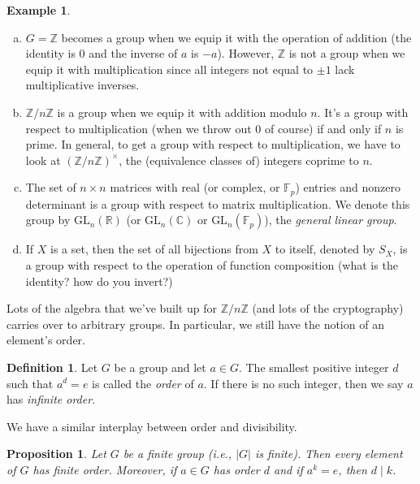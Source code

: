 \documentclass[12pt]{article}
\theoremstyle{plain}
\newtheorem{proposition}[theorem]{Proposition}
\theoremstyle{definition}
\newtheorem{definition}[theorem]{Definition}
\newtheorem{example}[theorem]{Example}
\theoremstyle{remark}
\newcommand{\Z}{\mathbb{Z}}
\newcommand{\C}{\mathbb{C}}
\newcommand{\R}{\mathbb{R}}
\newcommand{\F}{\mathbb{F}}
\begin{document}
\begin{example}
    \begin{enumerate}[(a)]
        \item $G = \Z$ becomes a group when we equip it with the operation of addition (the identity is 0 and the inverse of $a$ is $-a$).
        However, $\Z$ is not a group when we equip it with multiplication since all integers not equal to $\pm 1$ lack multiplicative inverses.

        \item $\Z/n\Z$ is a group when we equip it with addition modulo $n$.
        It's a group with respect to multiplication (when we throw out 0 of course) if and only if $n$ is prime.
        In general, to get a group with respect to multiplication, we have to look at $(\Z/n\Z)^\times$, the (equivalence classes of) integers coprime to $n$.

        \item The set of $n\times n$ matrices with real (or complex, or $\F_p$) entries and nonzero determinant is a group with respect to matrix multiplication.
        We denote this group by $\text{GL}_n(\R)$ (or $\text{GL}_n(\C)$ or $\text{GL}_n(\F_p)$), the \emph{general linear group}.

        \item If $X$ is a set, then the set of all bijections from $X$ to itself, denoted by $S_X$, is a group with respect to the operation of function composition (what is the identity? how do you invert?)
    \end{enumerate}   
\end{example}


Lots of the algebra that we've built up for $\Z/n\Z$ (and lots of the cryptography) carries over to arbitrary groups.
In particular, we still have the notion of an element's order.

\begin{definition}
    Let $G$ be a group and let $a\in G$.
    The smallest positive integer $d$ such that $a^d = e$ is called the \emph{order} of $a$.
    If there is no such integer, then we say $a$ has \emph{infinite order}.
\end{definition}

We have a similar interplay between order and divisibility.

\begin{proposition}
    Let $G$ be a finite group (i.e., $|G|$ is finite).
    Then every element of $G$ has finite order.
    Moreover, if $a\in G$ has order $d$ and if $a^k = e$, then $d \mid k$.
\end{proposition}
\end{document}
